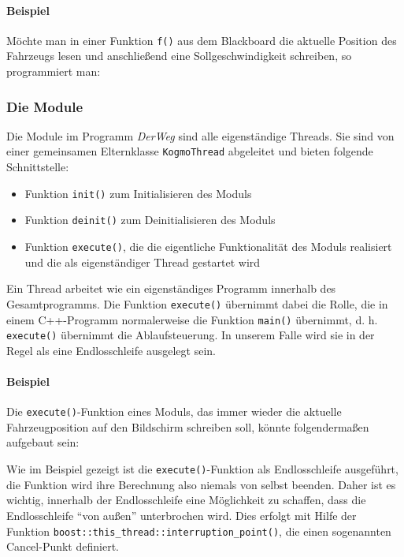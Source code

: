 \documentclass[a4paper, 11pt]{article}
\newcommand{\code}[1]{\texttt{#1}}
\newcommand{\codeex}[2][0.98\textwidth]{\vspace*{1ex}\noindent\fbox{\parbox{#1}{}}\vspace*{1ex}}
\newcommand{\DerWeg}{\textit{DerWeg }}  %
\begin{document}
{\paragraph{Beispiel}
Möchte man in einer Funktion \code{f()} aus dem Blackboard die aktuelle Position des Fahrzeugs lesen und anschließend eine Sollgeschwindigkeit schreiben, so programmiert man:

\codeex{beispielBlackboard.cpp}


\subsubsection{Die Module}
Die Module im Programm \DerWeg sind alle eigenständige Threads. Sie sind von einer gemeinsamen Elternklasse \code{KogmoThread} abgeleitet und bieten folgende Schnittstelle:
\begin{itemize}
\item Funktion \code{init()} zum Initialisieren des Moduls
\item Funktion \code{deinit()} zum Deinitialisieren des Moduls
\item Funktion \code{execute()}, die die eigentliche Funktionalität des Moduls realisiert und die als eigenständiger Thread gestartet wird
\end{itemize}

Ein Thread arbeitet wie ein eigenständiges Programm innerhalb des Gesamtprogramms. Die Funktion \code{execute()} übernimmt dabei die Rolle, die in einem C++-Programm normalerweise die Funktion \code{main()} übernimmt, d. h. \code{execute()} übernimmt die Ablaufsteuerung. In unserem Falle wird sie in der Regel als eine Endlosschleife ausgelegt sein.

\paragraph{Beispiel}
Die \code{execute()}-Funktion eines Moduls, das immer wieder die aktuelle Fahrzeugposition auf den Bildschirm schreiben soll, könnte folgendermaßen aufgebaut sein:

\codeex{beispielModulEinfach.cpp}

Wie im Beispiel gezeigt ist die \code{execute()}-Funktion als Endlosschleife ausgeführt, die Funktion wird ihre Berechnung also niemals von selbst beenden. Daher ist es wichtig, innerhalb der Endlosschleife eine Möglichkeit zu schaffen, dass die Endlosschleife "`von außen"' unterbrochen wird. Dies erfolgt mit Hilfe der Funktion  \code{boost::this\_thread::interruption\_point()}, die einen sogenannten Cancel-Punkt definiert.

}
\end{document}
